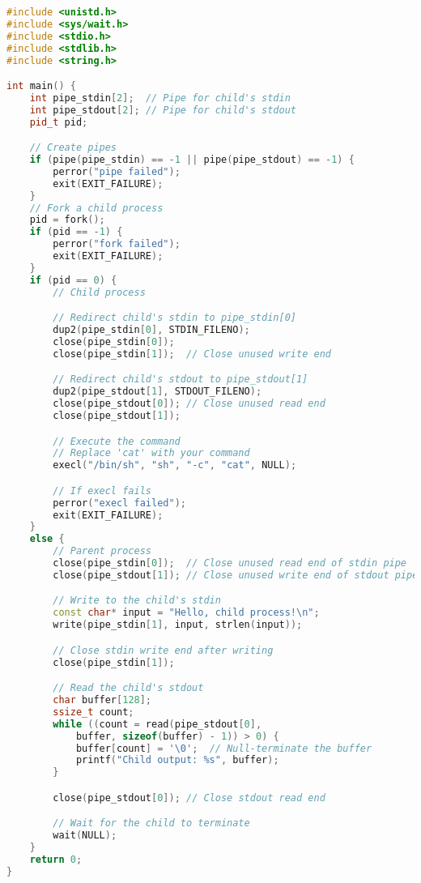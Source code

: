 \begin{lstlisting}[language=cpp]
#include <unistd.h>
#include <sys/wait.h>
#include <stdio.h>
#include <stdlib.h>
#include <string.h>

int main() {
    int pipe_stdin[2];  // Pipe for child's stdin
    int pipe_stdout[2]; // Pipe for child's stdout
    pid_t pid;

    // Create pipes
    if (pipe(pipe_stdin) == -1 || pipe(pipe_stdout) == -1) {
        perror("pipe failed");
        exit(EXIT_FAILURE);
    }
    // Fork a child process
    pid = fork();
    if (pid == -1) {
        perror("fork failed");
        exit(EXIT_FAILURE);
    }
    if (pid == 0) {
        // Child process

        // Redirect child's stdin to pipe_stdin[0]
        dup2(pipe_stdin[0], STDIN_FILENO);
        close(pipe_stdin[0]);
        close(pipe_stdin[1]);  // Close unused write end

        // Redirect child's stdout to pipe_stdout[1]
        dup2(pipe_stdout[1], STDOUT_FILENO);
        close(pipe_stdout[0]); // Close unused read end
        close(pipe_stdout[1]);

        // Execute the command
        // Replace 'cat' with your command
        execl("/bin/sh", "sh", "-c", "cat", NULL);

        // If execl fails
        perror("execl failed");
        exit(EXIT_FAILURE);
    }
    else {
        // Parent process
        close(pipe_stdin[0]);  // Close unused read end of stdin pipe
        close(pipe_stdout[1]); // Close unused write end of stdout pipe

        // Write to the child's stdin
        const char* input = "Hello, child process!\n";
        write(pipe_stdin[1], input, strlen(input));

        // Close stdin write end after writing
        close(pipe_stdin[1]);

        // Read the child's stdout
        char buffer[128];
        ssize_t count;
        while ((count = read(pipe_stdout[0],
            buffer, sizeof(buffer) - 1)) > 0) {
            buffer[count] = '\0';  // Null-terminate the buffer
            printf("Child output: %s", buffer);
        }

        close(pipe_stdout[0]); // Close stdout read end

        // Wait for the child to terminate
        wait(NULL);
    }
    return 0;
}
\end{lstlisting}
